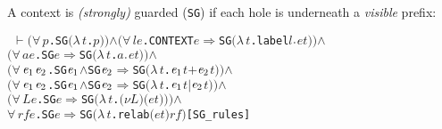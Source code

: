 \documentclass[GCNS]{yincog}
\renewcommand{\HOLinline}[1]{\mbox{\textup{\texttt{#1}}}}
\renewcommand{\HOLConst}[1]{\texttt{#1}}
\renewcommand{\HOLBoundVar}[1]{\ensuremath{\mathit{#1}}}
\renewcommand{\HOLSymConst}[1]{#1}
\renewcommand{\HOLTokenConj}{\ensuremath{\wedge}}
\renewcommand{\HOLTokenForall}{\ensuremath{\forall \,}}
\renewcommand{\HOLTokenLambda}{\ensuremath{\lambda \,}}
\renewcommand{\HOLTokenTurnstile}{\ensuremath{\:\:\vdash}}
\theoremstyle{remark}
\theoremstyle{theorem}
\theoremstyle{remark}
\renewcommand{\HOLTokenImp}{\ensuremath{\Longrightarrow}}
\begin{document}
A context is \emph{(strongly)} guarded (\HOLinline{\HOLConst{SG}}) if each
hole is underneath a \emph{visible} prefix:
%
\begin{alltt}
\HOLTokenTurnstile{} \ensuremath{(}\HOLSymConst{\HOLTokenForall{}}\HOLBoundVar{p}. \HOLConst{SG} \ensuremath{(}\HOLTokenLambda{}\HOLBoundVar{t}. \HOLBoundVar{p}\ensuremath{)}\ensuremath{)} \HOLSymConst{\HOLTokenConj{}} \ensuremath{(}\HOLSymConst{\HOLTokenForall{}}\HOLBoundVar{l} \HOLBoundVar{e}. \HOLConst{CONTEXT} \HOLBoundVar{e} \HOLSymConst{\HOLTokenImp{}} \HOLConst{SG} \ensuremath{(}\HOLTokenLambda{}\HOLBoundVar{t}. \HOLConst{label} \HOLBoundVar{l}\HOLSymConst{\ensuremath{\ldotp}}\HOLBoundVar{e} \HOLBoundVar{t}\ensuremath{)}\ensuremath{)} \HOLSymConst{\HOLTokenConj{}}
   \ensuremath{(}\HOLSymConst{\HOLTokenForall{}}\HOLBoundVar{a} \HOLBoundVar{e}. \HOLConst{SG} \HOLBoundVar{e} \HOLSymConst{\HOLTokenImp{}} \HOLConst{SG} \ensuremath{(}\HOLTokenLambda{}\HOLBoundVar{t}. \HOLBoundVar{a}\HOLSymConst{\ensuremath{\ldotp}}\HOLBoundVar{e} \HOLBoundVar{t}\ensuremath{)}\ensuremath{)} \HOLSymConst{\HOLTokenConj{}}
   \ensuremath{(}\HOLSymConst{\HOLTokenForall{}}\ensuremath{\HOLBoundVar{e}\sb{\mathrm{1}}} \ensuremath{\HOLBoundVar{e}\sb{\mathrm{2}}}. \HOLConst{SG} \ensuremath{\HOLBoundVar{e}\sb{\mathrm{1}}} \HOLSymConst{\HOLTokenConj{}} \HOLConst{SG} \ensuremath{\HOLBoundVar{e}\sb{\mathrm{2}}} \HOLSymConst{\HOLTokenImp{}} \HOLConst{SG} \ensuremath{(}\HOLTokenLambda{}\HOLBoundVar{t}. \ensuremath{\HOLBoundVar{e}\sb{\mathrm{1}}} \HOLBoundVar{t} \HOLSymConst{\ensuremath{+}} \ensuremath{\HOLBoundVar{e}\sb{\mathrm{2}}} \HOLBoundVar{t}\ensuremath{)}\ensuremath{)} \HOLSymConst{\HOLTokenConj{}}
   \ensuremath{(}\HOLSymConst{\HOLTokenForall{}}\ensuremath{\HOLBoundVar{e}\sb{\mathrm{1}}} \ensuremath{\HOLBoundVar{e}\sb{\mathrm{2}}}. \HOLConst{SG} \ensuremath{\HOLBoundVar{e}\sb{\mathrm{1}}} \HOLSymConst{\HOLTokenConj{}} \HOLConst{SG} \ensuremath{\HOLBoundVar{e}\sb{\mathrm{2}}} \HOLSymConst{\HOLTokenImp{}} \HOLConst{SG} \ensuremath{(}\HOLTokenLambda{}\HOLBoundVar{t}. \ensuremath{\HOLBoundVar{e}\sb{\mathrm{1}}} \HOLBoundVar{t} \HOLSymConst{\ensuremath{\mid}} \ensuremath{\HOLBoundVar{e}\sb{\mathrm{2}}} \HOLBoundVar{t}\ensuremath{)}\ensuremath{)} \HOLSymConst{\HOLTokenConj{}}
   \ensuremath{(}\HOLSymConst{\HOLTokenForall{}}\HOLBoundVar{L} \HOLBoundVar{e}. \HOLConst{SG} \HOLBoundVar{e} \HOLSymConst{\HOLTokenImp{}} \HOLConst{SG} \ensuremath{(}\HOLTokenLambda{}\HOLBoundVar{t}. \ensuremath{(\nu}\HOLBoundVar{L}\ensuremath{)} \ensuremath{(}\HOLBoundVar{e} \HOLBoundVar{t}\ensuremath{)}\ensuremath{)}\ensuremath{)} \HOLSymConst{\HOLTokenConj{}}
   \HOLSymConst{\HOLTokenForall{}}\HOLBoundVar{rf} \HOLBoundVar{e}. \HOLConst{SG} \HOLBoundVar{e} \HOLSymConst{\HOLTokenImp{}} \HOLConst{SG} \ensuremath{(}\HOLTokenLambda{}\HOLBoundVar{t}. \HOLConst{relab} \ensuremath{(}\HOLBoundVar{e} \HOLBoundVar{t}\ensuremath{)} \HOLBoundVar{rf}\ensuremath{)}\hfill{[SG\_rules]}
\end{alltt}
\end{document}
